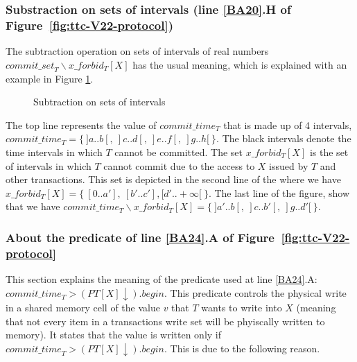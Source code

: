 \subsubsection{Substraction on sets of  intervals (line \ref{BA20}.H of 
Figure~\ref{fig:ttc-V22-protocol})}
\label{sec:appendix-forbid}

The subtraction  operation on sets of intervals of real numbers 
$\mathit{commit\_set}_T \backslash \mathit{x\_forbid_T}[X]$ 
has the usual meaning, which is explained with an example in Figure 
\ref{fig:substraction-on-intervals}.

\begin{figure}[ht]
\centering
\scalebox{0.35}{}
\caption{Subtraction on sets of intervals}
\label{fig:substraction-on-intervals}
\end{figure}

The top line represents the value of $commit\_time_T$  that is made 
up of 4 intervals, $commit\_time_T= \{~]a..b[,~]c..d[,~]e..f[, ~]g..h[~\}$. 
The  black intervals  denote  the time  intervals  in which  $T$ cannot  be
committed.  The set  $x\_forbid_T[X]$ is the set of  intervals in which $T$
cannot commit due  to the access to $X$ issued by $T$ and other transactions. 
This set  is depicted in the second line of the  
where we have  $x\_forbid_T[X]=  \{~[0..a'],~[b'..c'],[d'..+\infty[~\}$.
%
The last line of the figure, show that we  have 
 $commit\_time_T \backslash  x\_forbid_T[X]
                       = \{~]a'..b[,~]c..b'[, ~]g..d'[~\}$. 





\subsubsection{About the predicate of line \ref{BA24}.A 
of Figure~\ref{fig:ttc-V22-protocol}}
\label{sec:appendix-example-for-ct} 

This section explains the  meaning of the predicate used at line \ref{BA24}.A: 
$\mathit{commit\_time}_T > (PT[X] \downarrow).\mathit{begin}$. 
This predicate controls the physical write in a  shared memory cell
of the  value $v$ that $T$ wants to write into $X$
(meaning that not every item in a transactions write set will
be phyiscally written to memory). 
It states that the value is written only if 
$\mathit{commit\_time}_T > (PT[X] \downarrow).\mathit{begin}$. 
This is due to the following reason. 

